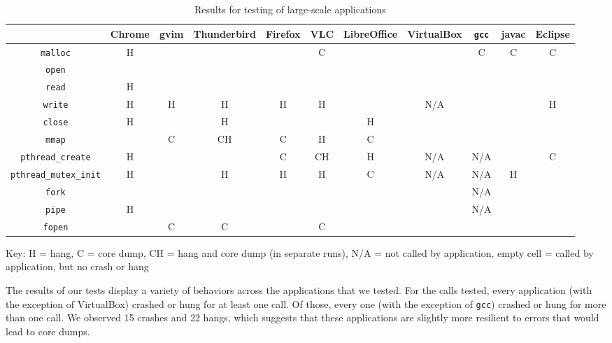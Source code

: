 \begin{table}[h!]
\centering
		\begin{adjustbox}{width=\textwidth}
		\begin{tabular}{|c|c|c|c|c|c|c|c|c|c|c|}
			\hline
			& Chrome & gvim & Thunderbird & Firefox & VLC & LibreOffice & VirtualBox & \texttt{gcc} & javac & Eclipse\\
			\hline
			\texttt{malloc} & H & & & & C &  & & C & C & C \\ \hline
			\texttt{open} & & & & & & & & & & \\ \hline
			\texttt{read} & H & & & & & & & & & \\ \hline
			\texttt{write} & H & H & H & H & H & & N/A& & & H \\ \hline
			\texttt{close} & H & & H & & & H & & & & \\ \hline
			\texttt{mmap} & & C & CH & C & H & C & & & &\\ \hline
			\texttt{pthread\_create}& H & &  & C & CH & H & N/A& N/A& & C \\ \hline
			\texttt{pthread\_mutex\_init} & H & & H & H & H & C & N/A& N/A & H &  \\ \hline
			\texttt{fork} & & & & & & & & N/A & & \\ \hline
			\texttt{pipe} & H & & & & & &  & N/A & &\\ \hline
			\texttt{fopen} & & C & C & & C & & & & & \\ \hline
		\end{tabular} 
		\end{adjustbox}
		Key: H = hang, C = core dump, CH = hang and core dump (in separate runs), N/A = not called by application, empty cell = called by application, but no crash or hang
\caption{Results for testing of large-scale applications}
\label{table:large_scale}
\end{table}

The results of our tests display a variety of behaviors across the applications that we tested. For the calls tested, every application (with the exception of VirtualBox) crashed or hung for at least one call. Of those, every one (with the exception of \texttt{gcc}) crashed or hung for more than one call. We observed 15 crashes and 22 hangs, which suggests that these applications are slightly more resilient to errors that would lead to core dumps. 

